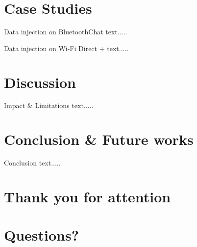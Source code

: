 \documentclass[10pt]{beamer}
\begin{document}
\section{Case Studies}
\begin{frame}[fragile]{Data injection on BluetoothChat}
text.....		
\end{frame}

\begin{frame}[fragile]{Data injection on Wi-Fi Direct +}
text.....		
\end{frame}


\section{Discussion}
\begin{frame}[fragile]{Impact \& Limitations}
text.....		
\end{frame}

\section{Conclusion \& Future works}
\begin{frame}[fragile]{Conclusion}
text.....		
\end{frame}

\section*{Thank you for attention}

\section*{Questions?}
\end{document}
